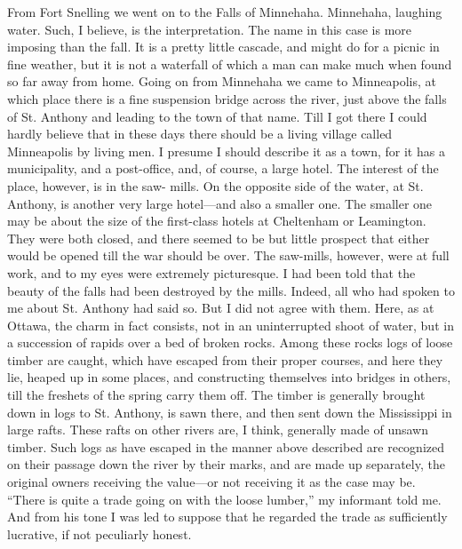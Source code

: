 From Fort Snelling we went on to the Falls of Minnehaha.
Minnehaha, laughing water.  Such, I believe, is the interpretation.
The name in this case is more imposing than the fall.  It is a
pretty little cascade, and might do for a picnic in fine weather,
but it is not a waterfall of which a man can make much when found
so far away from home.  Going on from Minnehaha we came to
Minneapolis, at which place there is a fine suspension bridge
across the river, just above the falls of St. Anthony and leading
to the town of that name.  Till I got there I could hardly believe
that in these days there should be a living village called
Minneapolis by living men.  I presume I should describe it as a
town, for it has a municipality, and a post-office, and, of course,
a large hotel.  The interest of the place, however, is in the saw-
mills.  On the opposite side of the water, at St. Anthony, is
another very large hotel---and also a smaller one.  The smaller one
may be about the size of the first-class hotels at Cheltenham or
Leamington.  They were both closed, and there seemed to be but
little prospect that either would be opened till the war should be
over.  The saw-mills, however, were at full work, and to my eyes
were extremely picturesque.  I had been told that the beauty of the
falls had been destroyed by the mills.  Indeed, all who had spoken
to me about St. Anthony had said so.  But I did not agree with
them.  Here, as at Ottawa, the charm in fact consists, not in an
uninterrupted shoot of water, but in a succession of rapids over a
bed of broken rocks.  Among these rocks logs of loose timber are
caught, which have escaped from their proper courses, and here they
lie, heaped up in some places, and constructing themselves into
bridges in others, till the freshets of the spring carry them off.
The timber is generally brought down in logs to St. Anthony, is
sawn there, and then sent down the Mississippi in large rafts.
These rafts on other rivers are, I think, generally made of unsawn
timber.  Such logs as have escaped in the manner above described
are recognized on their passage down the river by their marks, and
are made up separately, the original owners receiving the value---or
not receiving it as the case may be.  ``There is quite a trade going
on with the loose lumber,'' my informant told me.  And from his tone
I was led to suppose that he regarded the trade as sufficiently
lucrative, if not peculiarly honest.


